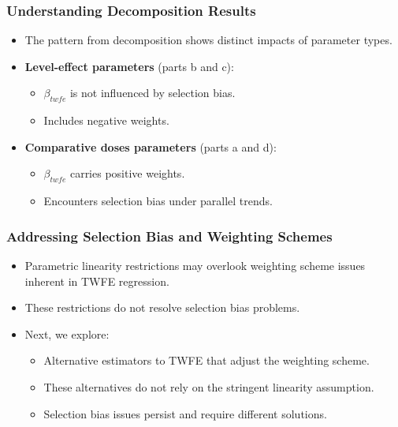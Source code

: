 \documentclass{beamer}
\begin{document}
\begin{frame}
\frametitle{Understanding Decomposition Results}

\begin{itemize}
  \item The pattern from decomposition shows distinct impacts of parameter types.
  \item \textbf{Level-effect parameters} (parts b and c):
    \begin{itemize}
      \item $\beta_{twfe}$ is not influenced by selection bias.
      \item Includes negative weights.
    \end{itemize}
  \item \textbf{Comparative doses parameters} (parts a and d):
    \begin{itemize}
      \item $\beta_{twfe}$ carries positive weights.
      \item Encounters selection bias under parallel trends.
    \end{itemize}
\end{itemize}
\end{frame}


\begin{frame}
\frametitle{Addressing Selection Bias and Weighting Schemes}

\begin{itemize}
  \item Parametric linearity restrictions may overlook weighting scheme issues inherent in TWFE regression.
  \item These restrictions do not resolve selection bias problems.
  \item Next, we explore:
    \begin{itemize}
      \item Alternative estimators to TWFE that adjust the weighting scheme.
      \item These alternatives do not rely on the stringent linearity assumption.
      \item Selection bias issues persist and require different solutions.
    \end{itemize}
\end{itemize}
\end{frame}
\end{document}
